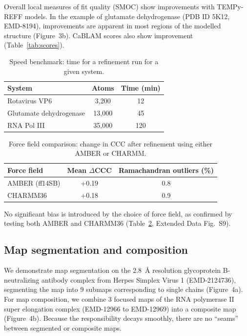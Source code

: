 \documentclass[11pt]{article}
\begin{document}
Overall local measures of fit quality (SMOC) show improvements with TEMPy-REFF models. In the example of glutamate dehydrogenase (PDB ID 5K12, EMD-8194), improvements are apparent in most regions of the modelled structure (Figure~3b). CaBLAM scores also show improvement (Table~\ref{tab:scores}).

\begin{table}[htbp]
\centering
\caption{Speed benchmark: time for a refinement run for a given system.}
\label{tab:speed}
\begin{tabular}{lcc}
\toprule
System & Atoms & Time (min) \\
\midrule
Rotavirus VP6 & 3,200 & 12 \\
Glutamate dehydrogenase & 13,000 & 45 \\
RNA Pol III & 35,000 & 120 \\
\bottomrule
\end{tabular}
\end{table}

\begin{table}[htbp]
\centering
\caption{Force field comparison: change in CCC after refinement using either AMBER or CHARMM.}
\label{tab:forcefield}
\begin{tabular}{lcc}
\toprule
Force field & Mean $\Delta$CCC & Ramachandran outliers (\%) \\
\midrule
AMBER (ff14SB) & +0.19 & 0.8 \\
CHARMM36 & +0.18 & 0.9 \\
\bottomrule
\end{tabular}
\end{table}

No significant bias is introduced by the choice of force field, as confirmed by testing both AMBER \citep{maier2015} and CHARMM36 \citep{best2012} (Table~\ref{tab:forcefield}, Extended Data Fig.~S9).

\subsection{Map segmentation and composition}

We demonstrate map segmentation on the 2.8~\AA{} resolution glycoprotein B-neutralizing antibody complex from Herpes Simplex Virus 1 (EMD-2124736), segmenting the map into 9 submaps corresponding to single chains (Figure~4a). For map composition, we combine 3 focused maps of the RNA polymerase II super elongation complex (EMD-12966 to EMD-12969) into a composite map (Figure~4b). Because the responsibility decays smoothly, there are no ``seams'' between segmented or composite maps.
\end{document}
